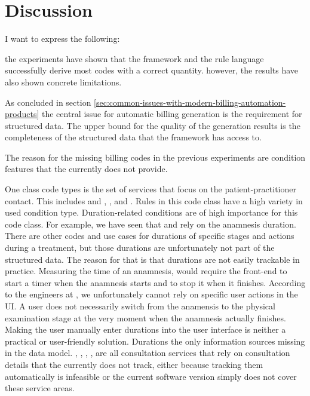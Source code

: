 \section{Discussion}\label{sec:discussion}

I want to express the following:

the experiments have shown that the framework and the rule language successfully derive most codes with a correct quantity.
however, the results have also shown concrete limitations.





As concluded in section \ref{sec:common-issues-with-modern-billing-automation-products} the central issue for automatic billing generation is the requirement for structured data.
The upper bound for the quality of the generation results is the completeness of the structured data that the framework has access to.

The reason for the missing billing codes in the previous experiments are condition features that the \RL currently does not provide.


One class code types is the set of services that focus on the patient-practitioner contact.
This includes  and , ,  and .
Rules in this code class have a high variety in used condition type.
Duration-related conditions are of high importance for this code class.
For example, we have seen that  and  rely on the anamnesis duration.
There are other codes and use cases for durations of specific stages and actions during a treatment, but those durations are unfortunately not part of the structured data.
The reason for that is that durations are not easily trackable in practice.
Measuring the time of an anamnesis, would require the front-end to start a timer when the anamnesis starts and to stop it when it finishes.
According to the engineers at \AV, we unfortunately cannot rely on specific user actions in the UI.
A user does not necessarily switch from the anamensis to the physical examination stage at the very moment when the anamnesis actually finishes.
Making the user manually enter durations into the user interface is neither a practical or user-friendly solution.
Durations the only information sources missing in the \AV data model.
, , , ,  are all consultation services that rely on consultation details that the \AV currently does not track,
either because tracking them automatically is infeasible or the current software version simply does not cover these service areas.




